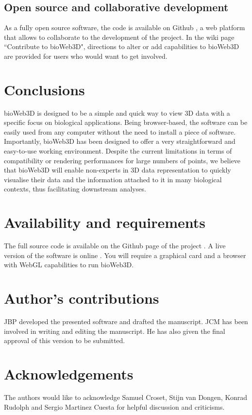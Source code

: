 \documentclass[10pt]{bmc_article}
\newenvironment{bmcformat}{\baselineskip20pt\sloppy\setboolean{publ}{false}}{\baselineskip20pt\sloppy}
\begin{document}
\begin{bmcformat}
	\subsection{Open source and collaborative development}
As a fully open source software, the code is available on Github \cite{github}, a web platform that allows to collaborate to the development of the project. In the wiki page ``Contribute to bioWeb3D", directions to alter or add capabilities to bioWeb3D are provided for users who would want to get involved.

\section{Conclusions}
bioWeb3D is designed to be a simple and quick way to view 3D data with a specific focus on biological applications.  Being browser-based, the software can be easily used from any computer without the need to install a piece of software. Importantly, bioWeb3D has been designed to offer a very straightforward and easy-to-use working environment. Despite the current limitations in terms of compatibility or rendering performances for large numbers of points, we believe that bioWeb3D will enable non-experts in 3D data representation to quickly visualise their data and the information attached to it in many biological contexts, thus facilitating downstream analyses.

\section{Availability and requirements}
The full source code is available on the Github page of the project \cite{github}. A live version of the software is online \cite{bioWeb3D}. You will require a graphical card and a browser with WebGL capabilities to run bioWeb3D.




\bigskip

\section*{Author's contributions}
JBP developed the presented software and drafted the manuscript. JCM has been involved in writing and editing the manuscript. He has also given the final approval of this version to be submitted.

    

\section*{Acknowledgements}
The authors would like to acknowledge Samuel Croset, Stijn van Dongen, Konrad Rudolph and Sergio Martinez Cuesta for helpful discussion and criticisms.
 

\end{bmcformat}
\end{document}
